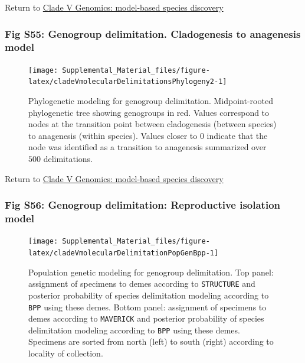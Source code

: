 \documentclass[
  11pt,
]{article}
\begin{document}
Return to \protect\hyperlink{model-based-species-discovery-9}{Clade V Genomics: model-based species discovery}
\pagebreak

\hypertarget{fig-s55-genogroup-delimitation.-cladogenesis-to-anagenesis-model}{%
\subsubsection{Fig S55: Genogroup delimitation. Cladogenesis to anagenesis model}\label{fig-s55-genogroup-delimitation.-cladogenesis-to-anagenesis-model}}

\begin{figure}
\texttt{[image: Supplemental\_Material\_files/figure-latex/cladeVmolecularDelimitationsPhylogeny2-1]} \caption{Phylogenetic modeling for genogroup delimitation. Midpoint-rooted phylogenetic tree showing genogroups in red. Values correspond to nodes at the transition point between cladogenesis (between species) to anagenesis (within species). Values closer to 0 indicate that the node was identified as a transition to anagenesis summarized over $500$ delimitations.}\label{fig:cladeVmolecularDelimitationsPhylogeny2}
\end{figure}

Return to \protect\hyperlink{model-based-species-discovery-9}{Clade V Genomics: model-based species discovery}
\pagebreak

\hypertarget{fig-s56-genogroup-delimitation-reproductive-isolation-model}{%
\subsubsection{Fig S56: Genogroup delimitation: Reproductive isolation model}\label{fig-s56-genogroup-delimitation-reproductive-isolation-model}}

\begin{figure}
\texttt{[image: Supplemental\_Material\_files/figure-latex/cladeVmolecularDelimitationPopGenBpp-1]} \caption{Population genetic modeling for genogroup delimitation. Top panel: assignment of specimens to demes according to \texttt{STRUCTURE} and posterior probability of species delimitation modeling according to \texttt{BPP} using these demes. Bottom panel: assignment of specimens to demes according to \texttt{MAVERICK} and posterior probability of species delimitation modeling according to \texttt{BPP} using these demes. Specimens are sorted from north (left) to south (right) according to locality of collection.}\label{fig:cladeVmolecularDelimitationPopGenBpp}
\end{figure}
\end{document}
